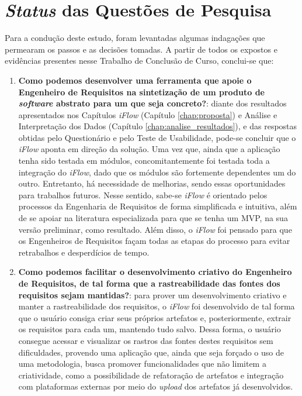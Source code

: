 \section{\textit{Status} das Questões de Pesquisa}

\label{sec:perguntas_respondidas}

Para a condução deste estudo, foram levantadas algumas indagações que permearam os passos e as decisões tomadas. A partir de todos os expostos e evidências presentes nesse Trabalho de Conclusão de Curso, conclui-se que:

\begin{enumerate}
    \item \textbf{Como podemos desenvolver uma ferramenta que apoie o Engenheiro de Requisitos na sintetização de um produto de \textit{software} abstrato para um que seja concreto?}: diante dos resultados apresentados nos Capítulos \textit{iFlow} (Capítulo \ref{chap:proposta}) e Análise e Interpretação dos Dados (Capítulo \ref{chap:analise_resultados}), e das respostas obtidas pelo Questionário e pelo Teste de Usabilidade, pode-se concluir que o \textit{iFlow} aponta em direção da solução. Uma vez que, ainda que a aplicação tenha sido testada em módulos, concomitantemente foi testada toda a integração do \textit{iFlow}, dado que os módulos são fortemente dependentes um do outro. Entretanto, há necessidade de melhorias, sendo essas oportunidades para trabalhos futuros. Nesse sentido, sabe-se \textit{iFlow} é orientado pelos processos da Engenharia de Requisitos de forma simplificada e intuitiva, além de se apoiar na literatura especializada para que se tenha um MVP, na sua versão preliminar, como resultado. Além disso, o \textit{iFlow} foi pensado para que os Engenheiros de Requisitos façam todas as etapas do processo para evitar retrabalhos e desperdícios de tempo.
    \item \textbf{Como podemos facilitar o desenvolvimento criativo do Engenheiro de Requisitos, de tal forma que a rastreabilidade das fontes dos requisitos sejam mantidas?}: para prover um desenvolvimento criativo e manter a rastreabilidade dos requisitos, o \textit{iFlow} foi desenvolvido de tal forma que o usuário consiga criar seus próprios artefatos e, posteriormente, extrair os requisitos para cada um, mantendo tudo salvo. Dessa forma, o usuário consegue acessar e visualizar os rastros das fontes destes requisitos sem dificuldades, provendo uma aplicação que, ainda que seja forçado o uso de uma metodologia, busca promover funcionalidades que não limitem a criatividade, como a possibilidade de refatoração de artefatos e integração com plataformas externas por meio do \textit{upload} dos artefatos já desenvolvidos.

\end{enumerate}

